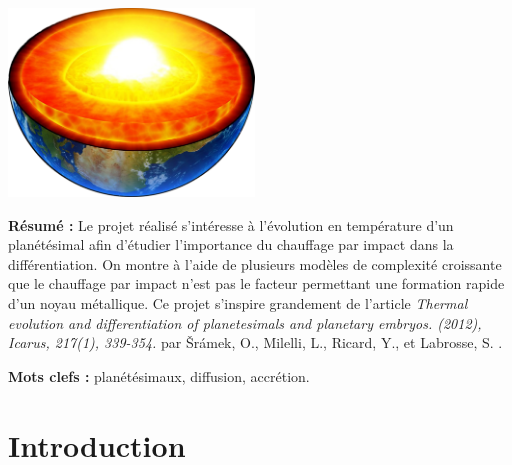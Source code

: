 \documentclass[10pt,a4paper]{article}
\numberwithin{equation}{section}
\begin{document}
\begin{titlepage}
\hrulefill


\begin{center}
\includegraphics[height=5cm]{figures/terre_core.pdf} 
\end{center} 


\textbf{Résumé :} Le projet réalisé s'intéresse à l'évolution en température d'un planétésimal afin d'étudier l'importance du chauffage par impact dans la différentiation. 
On montre à l'aide de plusieurs modèles de complexité croissante que le chauffage par impact n'est pas le facteur permettant une formation rapide d'un noyau métallique.
Ce projet s'inspire grandement de l'article \textit{Thermal evolution and differentiation of planetesimals and planetary embryos. (2012), Icarus, 217(1), 339-354.} par Šrámek, O., Milelli, L., Ricard, Y., et Labrosse, S. . 



\vspace{0.3cm}

\textbf{Mots clefs :} planétésimaux, diffusion, accrétion.
\vspace{0.3cm}


\tableofcontents

\end{titlepage}

\newpage
\renewcommand\thepage{\arabic{page}}


\setcounter{page}{1}




\section*{Introduction}
\end{document}
